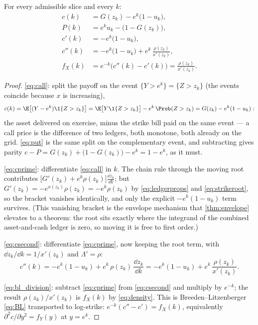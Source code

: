 \begin{proposition}
\label{prop:pricing}
For every admissible slice and every $k$:
\begin{align}
c(k)&=G(z_k)-e^{k}\big(1-u_k\big),
\label{eq:call}\\
P(k)&=e^{k}u_k-\big(1-G(z_k)\big),
\label{eq:put}\\
c'(k)&=-e^{k}\big(1-u_k\big),
\label{eq:cprime}\\
c''(k)&=-e^{k}\big(1-u_k\big)+e^{k}\,\frac{\rho(z_k)}{x'(z_k)},
\label{eq:csecond}\\
f_X(k)&=e^{-k}\big(c''(k)-c'(k)\big)=\frac{\rho(z_k)}{x'(z_k)} .
\label{eq:bl_division}
\end{align}
\end{proposition}

\begin{proof}
\eqref{eq:call}: split the payoff on the event $\{Y>e^{k}\}=\{Z>z_k\}$
(the events coincide because $x$ is increasing),
\[
c(k)=\E\big[(Y-e^{k})\1\{Z>z_k\}\big]
=\E\big[Y\1\{Z>z_k\}\big]-e^{k}\,\Prob(Z>z_k)
=G(z_k)-e^{k}(1-u_k):
\]
the asset delivered on exercise, minus the strike bill paid on the same
event --- a call price is the difference of two ledgers, both monotone,
both already on the grid.  \eqref{eq:put} is the same split on the
complementary event, and subtracting gives parity
$c-P=G(z_k)+\big(1-G(z_k)\big)-e^{k}=1-e^{k}$, as it must.

\eqref{eq:cprime}: differentiate \eqref{eq:call} in $k$.  The chain rule
through the moving root contributes
$\big[G'(z_k)+e^{k}\rho(z_k)\big]\frac{\dd z_k}{\dd k}$; but
$G'(z_k)=-e^{x(z_k)}\rho(z_k)=-e^{k}\rho(z_k)$ by \eqref{eq:ledgerprops}
and \eqref{eq:strikeroot}, so the bracket vanishes identically, and only
the explicit $-e^{k}(1-u_k)$ term survives.  (This vanishing bracket is
the envelope mechanism that \cref{thm:envelope} elevates to a theorem: the
root sits exactly where the integrand of the combined asset-and-cash
ledger is zero, so moving it is free to first order.)

\eqref{eq:csecond}: differentiate \eqref{eq:cprime}, now keeping the root
term, with $\dd z_k/\dd k=1/x'(z_k)$ and $\Lambda'=\rho$:
\[
c''(k)=-e^{k}(1-u_k)+e^{k}\,\rho(z_k)\,\frac{\dd z_k}{\dd k}
=-e^{k}(1-u_k)+e^{k}\,\frac{\rho(z_k)}{x'(z_k)} .
\]

\eqref{eq:bl_division}: subtract \eqref{eq:cprime} from \eqref{eq:csecond}
and multiply by $e^{-k}$; the result $\rho(z_k)/x'(z_k)$ is $f_X(k)$ by
\eqref{eq:density}.  This is Breeden--Litzenberger \eqref{eq:BL}
transported to log-strike: $e^{-k}(c''-c')=f_X(k)$, equivalently
$\partial^2c/\partial y^2=f_Y(y)$ at $y=e^k$.
\end{proof}

